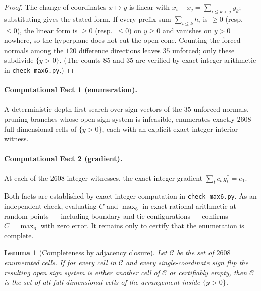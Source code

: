 \documentclass[11pt]{article}
\newtheorem{lemma}{Lemma}
\theoremstyle{definition}
\begin{document}
\begin{proof}
The change of coordinates $x\mapsto y$ is linear with $x_i-x_j=\sum_{i\le k<j}y_k$; substituting gives the
stated form. If every prefix sum $\sum_{i\le k}h_i$ is $\ge 0$ (resp.\ $\le 0$), the linear form is
$\ge 0$ (resp.\ $\le 0$) on $y\ge 0$ and vanishes on $y>0$ nowhere, so the hyperplane does not cut the open
cone. Counting the forced normals among the $120$ difference directions leaves $35$ unforced; only these
subdivide $\{y>0\}$. (The counts $85$ and $35$ are verified by exact integer arithmetic in
\texttt{check\_max6.py}.)
\end{proof}

\paragraph{Computational Fact 1 (enumeration).} A deterministic depth-first search over sign vectors of the
$35$ unforced normals, pruning branches whose open sign system is infeasible, enumerates exactly $2608$
full-dimensional cells of $\{y>0\}$, each with an explicit exact integer interior witness.

\paragraph{Computational Fact 2 (gradient).} At each of the $2608$ integer witnesses, the exact-integer
gradient $\sum_t c_t\,g_t^\ast=e_1$.

Both facts are established by exact integer computation in \texttt{check\_max6.py}. As an independent
check, evaluating $C$ and $\max_6$ in exact rational arithmetic at random points --- including boundary and
tie configurations --- confirms $C=\max_6$ with zero error. It remains only to certify that the enumeration
is complete.

\begin{lemma}[Completeness by adjacency closure]\label{lem:closure}
Let $\mathcal{C}$ be the set of $2608$ enumerated cells. If for every cell in $\mathcal{C}$ and every
single-coordinate sign flip the resulting open sign system is either another cell of $\mathcal{C}$ or
certifiably empty, then $\mathcal{C}$ is the set of all full-dimensional cells of the arrangement inside
$\{y>0\}$.
\end{lemma}
\end{document}

